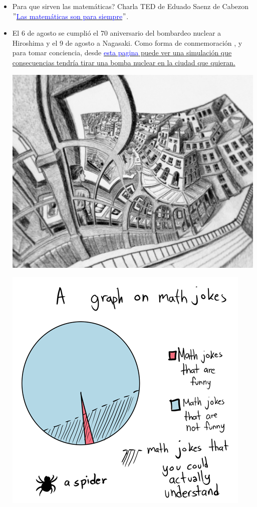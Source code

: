 \documentclass[a4paper,11pt,spanish,sans]{exam}
\begin{document}
\begin{itemize}
\item Para que sirven las matemáticas? Charla TED de Eduado Saenz de Cabezon \href{https://www.youtube.com/watch?v=jej8qlzlAGw}{\textcolor{blue}{ $"$Las matemáticas son para siempre$"$}}.

\item El 6 de agosto se cumplió el 70 aniversario del bombardeo nuclear a Hiroshima y el 9 de agosto a Nagasaki. Como forma de conmemoración , y para tomar conciencia, desde  \href{http://nuclearsecrecy.com/nukemap/}{\textcolor{blue}{esta pagina} puede ver una simulación que consecuencias tendría tirar una bomba nuclear en la ciudad que quieran.}

 

\begin{minipage}{0.5\textwidth}

\centering
\includegraphics[width= 0.8\linewidth]{esch.jpg}
\label{fig:univerise}

\end{minipage}
\begin{minipage}{0.5\textwidth}

\centering
\includegraphics[width= 0.7\linewidth]{mathjokegraph.png}
\label{fig:erise}

\end{minipage}

\end{itemize}
\end{document}
